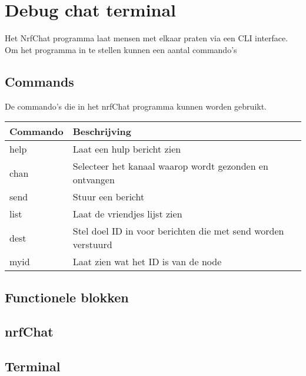 \section{Debug chat terminal} \label{sec:debugProgram}

Het NrfChat programma laat mensen met elkaar praten via een CLI interface. Om het programma in te stellen kunnen een aantal commando's

\subsection{Commands}
De commando's die in het nrfChat programma kunnen worden gebruikt.

\begin{table}[h]
    \begin{tabular}{|l|l|} \hline
        \textbf{Commando} & \textbf{Beschrijving} \\\hline
        help & Laat een hulp bericht zien \\\hline
        chan & Selecteer het kanaal waarop wordt gezonden en ontvangen\\\hline
        send & Stuur een bericht \\\hline
        list & Laat de vriendjes lijst zien\\\hline
        dest & Stel doel ID in voor berichten die met send worden verstuurd \\\hline
        myid & Laat zien wat het ID is van de node \\\hline
    \end{tabular}
\end{table}

\subsection{Functionele blokken}

\subsection{nrfChat}
    

\subsection{Terminal}
    
    

    